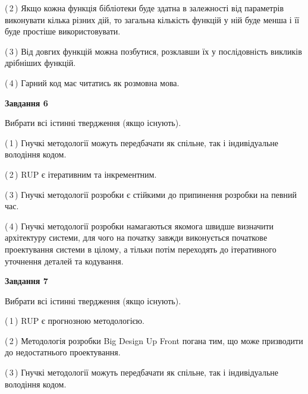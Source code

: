 \documentclass[10pt, ukrainian]{article}
\begin{document}
{\begin {large}
(\,2\,) Якщо кожна функція бібліотеки буде здатна в залежності від параметрів виконувати кілька різних дій, то загальна кількість функцій у ній буде менша і її буде простіше використовувати. %



(\,3\,) Від довгих функцій можна позбутися, розклавши їх у послідовність викликів дрібніших функцій. %



(\,4\,) Гарний код має читатись як розмовна мова. %

\newpage

{\begin {center}\textbf{Завдання 6}\end {center}}\par
Вибрати всі істинні твердження (якщо існують).\par
\vspace{2mm}



(\,1\,) Гнучкі методології можуть передбачати як спільне, так і індивідуальне володіння кодом. %



(\,2\,) RUP є ітеративним та інкрементним.%



(\,3\,) Гнучкі методології розробки є стійкими до припинення розробки на певний час. %



(\,4\,) Гнучкі методології розробки намагаються якомога швидше визначити архітектуру системи, для чого на початку завжди виконується початкове проектування системи в цілому, а тільки потім переходять до ітеративного уточнення деталей та кодування. %


{\begin {center}\textbf{Завдання 7}\end {center}}\par
Вибрати всі істинні твердження (якщо існують).\par
\vspace{2mm}



(\,1\,) RUP є прогнозною методологією. %



(\,2\,) Методологія розробки Big Design Up Front погана тим, що може призводити до недостатнього проектування.%



(\,3\,) Гнучкі методології можуть передбачати як спільне, так і індивідуальне володіння кодом. %




\end{large}}
\end{document}
